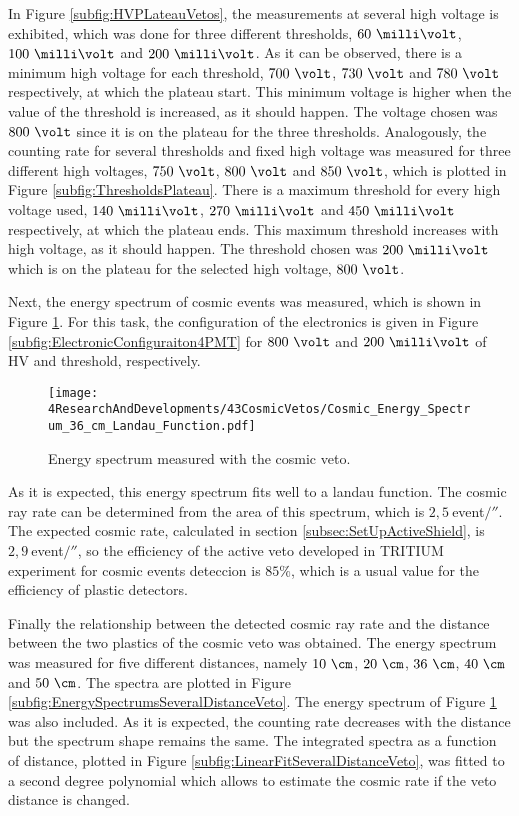 In Figure \ref{subfig:HVPLateauVetos}, the measurements at several high voltage is exhibited, which was done for three different thresholds, $60~\milli\volt$, $100~\milli\volt$ and $200~\milli\volt$. As it can be observed, there is a minimum high voltage for each threshold, $700~\volt$, $730~\volt$ and $780~\volt$ respectively, at which the plateau start. This minimum voltage is higher when the value of the threshold is increased, as it should happen. The voltage chosen was $800~\volt$ since it is on the plateau for the three thresholds. Analogously, the counting rate for several thresholds and fixed high voltage was measured for three different high voltages, $750~\volt$, $800~\volt$ and $850~\volt$, which is plotted in Figure \ref{subfig:ThresholdsPlateau}. There is a maximum threshold for every high voltage used,  $140~\milli\volt$, $270~\milli\volt$ and $450~\milli\volt$ respectively, at which the plateau ends. This maximum threshold increases with high voltage, as it should happen. The threshold chosen was $200~\milli\volt$ which is on the plateau for the selected high voltage, $800~\volt$. 

Next, the energy spectrum of cosmic events was measured, which is shown in Figure \ref{fig:EnergySpectrumCosmicVeto}. For this task, the configuration of the electronics is given in Figure \ref{subfig:ElectronicConfiguraiton4PMT} for $800~\volt$ and $200~\milli\volt$ of HV and threshold, respectively. 

\begin{figure}[h]
\centering
\texttt{[image: 4ResearchAndDevelopments/43CosmicVetos/Cosmic\_Energy\_Spectrum\_36\_cm\_Landau\_Function.pdf]}
\caption{Energy spectrum measured with the cosmic veto.\label{fig:EnergySpectrumCosmicVeto}}
\end{figure}

As it is expected, this energy spectrum fits well to a landau function. The cosmic ray rate can be determined from the area of this spectrum, which is $2,5~$event$/\second$. The expected cosmic rate, calculated in section \ref{subsec:SetUpActiveShield}, is $2,9~$event$/\second$, so the efficiency of the active veto developed in TRITIUM experiment for cosmic events deteccion is $85\%$, which is a usual value for the efficiency of plastic detectors.

Finally the relationship between the detected cosmic ray rate and the distance between the two plastics of the cosmic veto was obtained. The energy spectrum was measured for five different distances, namely $10~\cm$, $20~\cm$, $36~\cm$, $40~\cm$ and $50~\cm$. The spectra are plotted in Figure \ref{subfig:EnergySpectrumsSeveralDistanceVeto}. The energy spectrum of Figure \ref{fig:EnergySpectrumCosmicVeto} was also included. As it is expected, the counting rate decreases with the distance but the spectrum shape remains the same. The integrated spectra as a function of distance, plotted in Figure \ref{subfig:LinearFitSeveralDistanceVeto}, was fitted to a second degree polynomial which allows to estimate the cosmic rate if the veto distance is changed.

